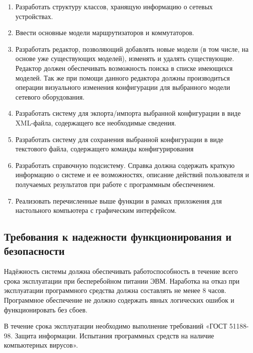 \documentclass[a4paper,14pt]{extreport}
\begin{document}
	\begin{enumerate}
		\item Разработать структуру классов, хранящую информацию о сетевых устройствах.
		
		\item Ввести основные модели маршрутизаторов и коммутаторов.
		
		\item Разработать редактор, позволяющий добавлять новые модели (в том числе, на основе уже существующих моделей), изменять и удалять существующие. Редактор должен обеспечивать возможность поиска в списке имеющихся моделей. Так же при помощи данного редактора должны производиться операции визуального изменения конфигурации для выбранного модели сетевого оборудования.
		
		\item Разработать систему для экпорта/импорта выбранной конфигурации в виде XML-файла, содержащего все необходимые сведения.
		
		\item Разработать систему для сохранения выбранной конфигурации в виде текстового файла, содержащего команды конфигурирования
		
		\item Разработать справочную подсистему. Справка должна содержать краткую информацию о системе и ее возможностях, описание действий пользователя и получаемых результатов при работе с программным обеспечением.
		
		\item Реализовать перечисленные выше функции в рамках приложения для настольного компьютера с графическим интерфейсом.
	\end{enumerate}
	
	\subsection{Требования к надежности функционирования и безопасности}
	
	Надёжность системы должна обеспечивать работоспособность в течение всего срока эксплуатации при бесперебойном питании ЭВМ. Наработка на отказ при эксплуатации программного средства должна составлять не менее 8 часов. Программное обеспечение не должно содержать явных логических ошибок и функционировать без сбоев.
	
	В течение срока эксплуатации необходимо выполнение требований «ГОСТ 51188-98. Защита информации. Испытания программных средств на наличие компьютерных вирусов».
	
\end{document}
